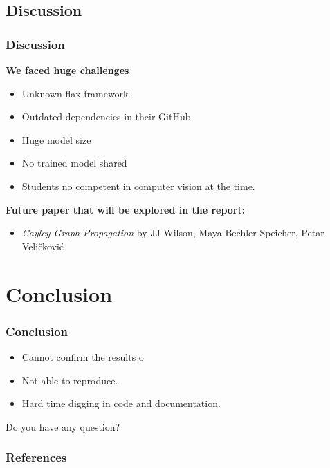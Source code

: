 \documentclass[10pt, aspectratio = 169]{beamer}
\begin{document}
\subsection{Discussion}
\begin{frame}
    \frametitle{Discussion}
    \textbf{We faced huge challenges}
    \begin{itemize}
        \item Unknown flax framework
        \item Outdated dependencies in their GitHub
        \item Huge model size
        \item No trained model shared
        \item Students no competent in computer vision at the time.
    \end{itemize} 
    
    \textbf{Future paper that will be explored in the report:}
    \begin{itemize}
        \item \textit{Cayley Graph Propagation} by JJ Wilson, Maya 
        Bechler-Speicher, Petar Veličković \cite{wilson2024cayleygraphpropagation}
    \end{itemize}
\end{frame}

\section{Conclusion}
\begin{frame}
    \frametitle{Conclusion}
    \begin{itemize}
        \item Cannot confirm the results o
        \item Not able to reproduce.
        \item Hard time digging in code and documentation.
    \end{itemize}

    \begin{block}{Do you have any question?}
        
    \end{block}
\end{frame}

\begin{frame}
    \frametitle{References}
    \scriptsize
    
    

\end{frame}

\end{document}
